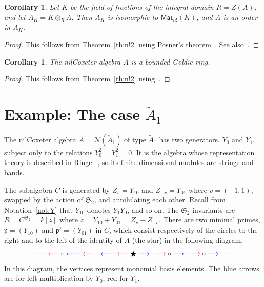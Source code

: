 \documentclass[12pt]{amsart}
\newcommand{\Mat}{\mathsf{Mat}}
\newcommand{\sym}[1]{\mathfrak{S}_{#1}}
\newcommand{\mcN}{\mathcal{N}}
\newcommand{\mfp}{\mathfrak{p}}
\numberwithin{equation}{section}
\newtheorem{corollary}[equation]{Corollary}
\theoremstyle{definition}
\begin{document}
\begin{corollary}
Let $K$ be the field of fractions of the integral domain $R=Z(A)$, and
let $A_K=K\otimes_RA$. Then
$A_K$ is isomorphic to $\Mat_{n!}(K)$, and $A$ is an order in $A_K$.
\end{corollary}
\begin{proof}
This follows from Theorem~\ref{th:n!2} using Posner's theorem~\cite{Posner:1960a}. 
See also~\cite[Theorem~13.6.5]{McConnell/Robson:2001a}.
\end{proof}

\begin{corollary}
The nilCoxeter algebra $A$ is a bounded Goldie ring.
\end{corollary}
\begin{proof}
This follows from Theorem~\ref{th:n!2} 
using~\cite[Corollary~13.6.6]{McConnell/Robson:2001a}.
\end{proof}


\section{\texorpdfstring{Example: The case $\tilde A_1$}
{Example: The case Ã₁}}\label{se:A1tilde}

The nilCoxeter algebra $A=\mcN(\tilde A_1)$ of type $\tilde A_1$ has two generators, $Y_0$
and $Y_1$, subject only to the relations $Y_0^2=Y_1^2=0$. It is the
algebra whose representation theory is described in
Ringel~\cite{Ringel:1975a}, so its finite dimensional modules are
strings and bands. 


The subalgebra $C$ is generated by $Z_v=Y_{10}$ and
$Z_{-v}=Y_{01}$ where $v=(-1,1)$, swapped by the action of $\sym{2}$, and
annihilating each other. Recall from Notation~\ref{not:Y} that
$Y_{10}$ denotes $Y_1Y_0$, and so on. The
$\sym{2}$-invariants are $R=C^{\sym{2}}=k[z]$ where $z=Y_{10}+Y_{01}=Z_v+Z_{-v}$.
There are two minimal primes, $\mfp=(Y_{10})$ and $\mfp'=(Y_{01})$ in
$C$, which consist respectively of the circles to the right and to the left of
the identity of $A$  (the star) in the following diagram.
\[ \xymatrix@=0.5cm{&\cdot\ar@{..}[l]&
\smash{\circ}\ar@[red][l]&\cdot\ar@[blue][l]&\smash{\circ}\ar@[red][l]&
\cdot\ar@[blue][l]&\smash{\bigstar}\ar@[red][l]\ar@[blue][r]&
\cdot\ar@[red][r]&\smash{\circ}\ar@[blue][r]&\cdot\ar@[red][r]
&\smash{\circ}\ar@[blue][r]&\cdot\ar@{..}[r]&} \]
In this diagram, the vertices represent monomial basis elements. The
blue arrows are for left multiplication by $Y_0$, red for $Y_1$.\medskip
\end{document}
